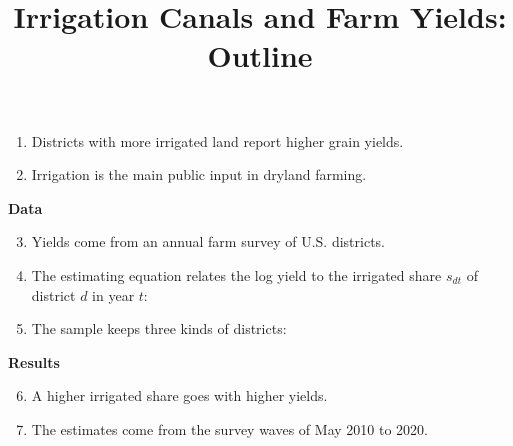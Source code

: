 \documentclass[12pt]{article}
\title{Irrigation Canals and Farm Yields: Outline}
\begin{document}
\begin{enumerate}
\item Districts with more irrigated land report higher grain yields.
\item Irrigation is the main public input in dryland farming.
\end{enumerate}

{\large\textbf{Data}}
\begin{enumerate}\setcounter{enumi}{2}
\item Yields come from an annual farm survey of U.S. districts.
\item The estimating equation relates the log yield to the irrigated share $s_{dt}$ of district
  $d$ in year $t$:
\item The sample keeps three kinds of districts:
\end{enumerate}

{\large\textbf{Results}}
\begin{enumerate}\setcounter{enumi}{5}
\item A higher irrigated share goes with higher yields.
\item The estimates come from the survey waves of May 2010 to 2020.
\end{enumerate}
\end{document}
